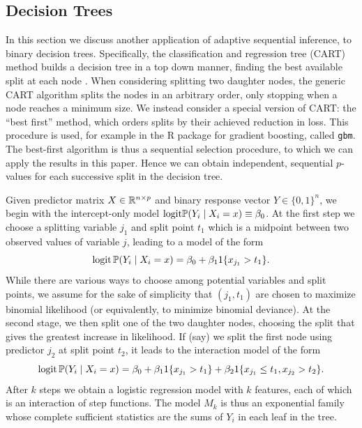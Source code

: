 \documentclass{article}
\begin{document}
\subsection{Decision Trees}
In this section we discuss another application of adaptive sequential inference, to binary decision trees. Specifically, the classification and regression tree  (CART)  method builds a decision tree in a top down manner, finding the best available split at each node \citep{breiman1984classification}.  When considering splitting two daughter nodes, the generic CART algorithm splits the nodes in an arbitrary order, only stopping when a node reaches a minimum size.  We instead consider a  special version of CART: the ``best first'' method, which orders splits by their achieved reduction in loss. This procedure is used, for example in the R package for gradient boosting, called {\tt gbm}. The best-first algorithm is thus a sequential selection  procedure, to which we can apply the results in this paper. Hence we can obtain independent, sequential $p$-values for each successive split in the decision tree. 

Given predictor matrix $X \in \mathbb{R}^{n\times p}$ and binary response vector $Y\in \{0,1\}^n$, we begin with the intercept-only model $\textrm{logit} \mathbb{P}(Y_i \mid X_i = x) \equiv \beta_0$. At the first step we choose a splitting variable $j_1$ and split point $t_1$ which is a midpoint between two observed values of variable $j$, leading to a model of the form
\begin{equation*}
\textrm{logit} \,\mathbb{P}(Y_i \mid X_i=x) = \beta_0 + \beta_{1} 1\{x_{j_1} > t_1\}.
\end{equation*}
While there are various ways to choose among potential variables and split points, we assume for the sake of simplicity that $(j_1,t_1)$ are chosen to maximize binomial likelihood (or equivalently, to minimize binomial deviance). At the second stage, we then split one of the two daughter nodes, choosing the split that gives the greatest increase in likelihood. If (say) we split the first node using predictor $j_2$ at split point $t_2$, it leads to the interaction model of the form
\begin{equation}
\textrm{logit} \,\mathbb{P}(Y_i \mid X_i=x) = \beta_0 + \beta_{1} 1\{x_{j_1} > t_1\} + \beta_2 1\{x_{j_1} \leq t_1, x_{j_2} > t_2\}.
\label{eqn:intmodel}
\end{equation}
After $k$ steps we obtain a logistic regression model with $k$ features, each of which is an interaction of step functions. The model $M_k$ is thus an exponential family whose complete sufficient statistics are the sums of $Y_i$ in each leaf in the tree.
\end{document}
